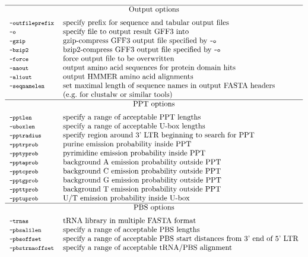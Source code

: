 \documentclass[12pt,titlepage]{article}
\begin{document}
\begin{table}[htbp]
\begin{footnotesize}
\[\begin{tabular}{ll}
\Showoptiongroup{Output options}
\Showoption{outfileprefix}& specify prefix for sequence and tabular output files
\\
\Showoption{o}& specify file to output result GFF3 into
\\
\Showoption{gzip}& gzip-compress GFF3 output file specified by \Showoption{o}
\\
\Showoption{bzip2}& bzip2-compress GFF3 output file specified by \Showoption{o}
\\
\Showoption{force}& force output file to be overwritten
\\
\Showoption{aaout}& output amino acid sequences for protein domain hits
\\
\Showoption{aliout}& output HMMER amino acid alignments
\\
\Showoption{seqnamelen}& set maximal length of sequence names in output FASTA headers\\
                       & (e.g.\@ for clustalw or similar tools)
\\
\Showoptiongroup{PPT options}
\Showoption{pptlen}& specify a range of acceptable PPT lengths
\\
\Showoption{uboxlen}& specify a range of acceptable U-box lengths
\\
\Showoption{pptradius}& specify region around 3' LTR beginning to search for PPT
\\
\Showoption{pptrprob}& purine emission probability inside PPT
\\
\Showoption{pptyprob}& pyrimidine emission probability inside PPT
\\
\Showoption{pptaprob}& background A emission probability outside PPT
\\
\Showoption{pptcprob}& background C emission probability outside PPT
\\
\Showoption{pptgprob}& background G emission probability outside PPT
\\
\Showoption{ppttprob}& background T emission probability outside PPT
\\
\Showoption{pptuprob}& U/T emission probability inside U-box
\\
\Showoptiongroup{PBS options}
\Showoption{trnas}& tRNA library in multiple FASTA format
\\
\Showoption{pbsalilen}& specify a range of acceptable PBS lengths
\\
\Showoption{pbsoffset}& specify a range of acceptable PBS start distances from
3' end of 5' LTR
\\
\Showoption{pbstrnaoffset}& specify a range of acceptable tRNA/PBS alignment

\end{tabular}\]
\end{footnotesize}
\end{table}
\end{document}

